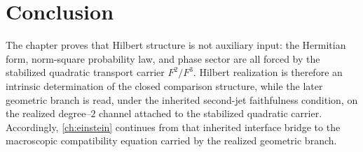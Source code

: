 \section{Conclusion}
\label{sec:hilbert-conclusion}
The chapter proves that Hilbert structure is not auxiliary input: the
Hermitian form, norm-square probability law, and phase sector are all
forced by the stabilized quadratic transport carrier \(F^2/F^3\).
Hilbert realization is therefore an intrinsic determination of the
closed comparison structure, while the later geometric branch is read,
under the inherited second-jet faithfulness condition, on the realized
degree--\(2\) channel attached to the stabilized quadratic carrier.
Accordingly, \cref{ch:einstein} continues from that inherited
interface bridge to the macroscopic compatibility equation carried by
the realized geometric branch.

\begin{chapterclosing}
\end{chapterclosing}
